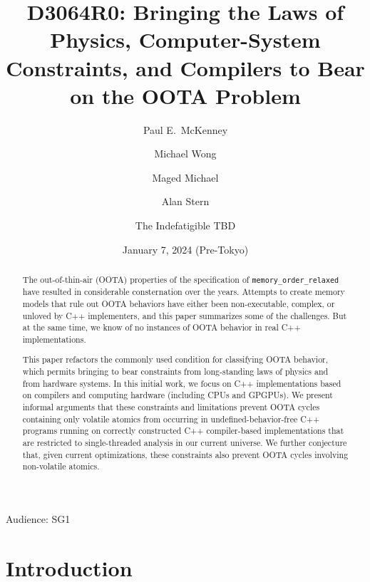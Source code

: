 \documentclass[10]{article}
\begin{document}
\title{D3064R0: Bringing the Laws of Physics, Computer-System Constraints, and Compilers to Bear on the OOTA Problem}

\newcommand{\co}[1]{\lstinline[breaklines=yes,breakatwhitespace=yes]{#1}}

\author{
Paul E.~McKenney\\ \and
Michael Wong\\ \and
Maged Michael\\ \and
Alan Stern\\ \and
The Indefatigible TBD
}
\date{January 7, 2024 (Pre-Tokyo)}
\maketitle{}

Audience: SG1

\begin{abstract}
	The out-of-thin-air (OOTA) properties of the specification
	of \co{memory_order_relaxed} have resulted in considerable
	consternation over the years.
	Attempts to create memory models that rule out OOTA behaviors
	have either been non-executable, complex, or unloved by C++
	implementers, and this paper summarizes some of the challenges.
	But at the same time, we know of no instances of OOTA behavior
	in real C++ implementations.

	This paper refactors the commonly used condition for classifying
	OOTA behavior, which permits bringing to bear constraints from
	long-standing laws of physics and from hardware systems.
	In this initial work, we focus on C++ implementations based
	on compilers and computing hardware (including CPUs and GPGPUs).
	We present informal arguments that these constraints and
	limitations prevent OOTA cycles containing only volatile atomics
	from occurring in undefined-behavior-free C++ programs running on
	correctly constructed C++ compiler-based implementations that are
	restricted to single-threaded analysis in our current universe.
	We further conjecture that, given current optimizations, these
	constraints also prevent OOTA cycles involving non-volatile
	atomics.
\end{abstract}

\pagebreak

\tableofcontents

\pagebreak

\section{Introduction}
\label{sec:Introduction}
\end{document}
